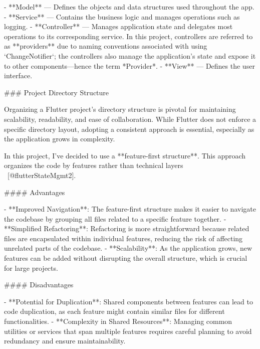 \documentclass[
  digital,     %
  oneside,     %
  nosansbold,  %
  nocolorbold, %
  lof,         %
  lot,         %
]{fithesis4}
\begin{document}
\begin{markdown}
- **Model** — Defines the objects and data structures used throughout the app.
- **Service** — Contains the business logic and manages operations such as logging.
- **Controller** — Manages application state and delegates most operations to its corresponding service. In this project, controllers are referred to as **providers** due to naming conventions associated with using `ChangeNotifier`; the controllers also manage the application's state and expose it to other components—hence the term *Provider*.
- **View** — Defines the user interface.

### Project Directory Structure

Organizing a Flutter project's directory structure is pivotal for maintaining scalability, readability, and ease of collaboration. While Flutter does not enforce a specific directory layout, adopting a consistent approach is essential, especially as the application grows in complexity.

In this project, I've decided to use a **feature-first structure**. This approach organizes the code by features rather than technical layers ~[@flutterStateMgmt2].

#### Advantages

- **Improved Navigation**: The feature-first structure makes it easier to navigate the codebase by grouping all files related to a specific feature together.
- **Simplified Refactoring**: Refactoring is more straightforward because related files are encapsulated within individual features, reducing the risk of affecting unrelated parts of the codebase.
- **Scalability**: As the application grows, new features can be added without disrupting the overall structure, which is crucial for large projects.

#### Disadvantages

- **Potential for Duplication**: Shared components between features can lead to code duplication, as each feature might contain similar files for different functionalities.
- **Complexity in Shared Resources**: Managing common utilities or services that span multiple features requires careful planning to avoid redundancy and ensure maintainability.

\end{markdown}
\end{document}

